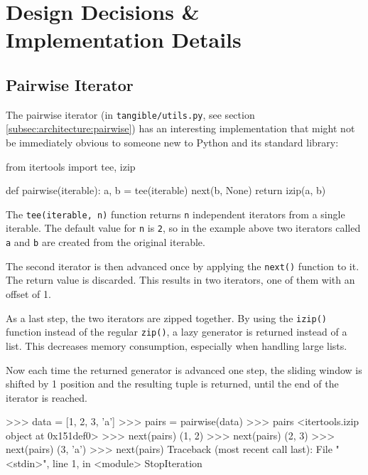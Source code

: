 
\chapter{Design Decisions \& Implementation Details}

\label{ch:design}


\section{Pairwise Iterator} \label{sec:design:pairwise}

The pairwise iterator (in \texttt{tangible/utils.py}, see section
\ref{subsec:architecture:pairwise}) has an interesting implementation that might
not be immediately obvious to someone new to Python and its standard library:

\vspace{.5\baselineskip}
\begin{pythoncode}
from itertools import tee, izip

def pairwise(iterable):
    a, b = tee(iterable)
    next(b, None)
    return izip(a, b)
\end{pythoncode}

\noindent The \texttt{tee(iterable, n)} function returns \texttt{n} independent
iterators from a single iterable. The default value for \texttt{n} is
\texttt{2}, so in the example above two iterators called \texttt{a} and
\texttt{b} are created from the original iterable.

The second iterator is then advanced once by applying the \texttt{next()}
function to it. The return value is discarded. This results in two iterators,
one of them with an offset of 1.

As a last step, the two iterators are zipped together. By using the
\texttt{izip()} function instead of the regular \texttt{zip()}, a lazy generator
is returned instead of a list. This decreases memory consumption, especially
when handling large lists.

Now each time the returned generator is advanced one step, the sliding window is
shifted by 1 position and the resulting tuple is returned, until the end of the
iterator is reached.

\vspace{.5\baselineskip}
\begin{pythoncode}
>>> data = [1, 2, 3, 'a']
>>> pairs = pairwise(data)
>>> pairs
<itertools.izip object at 0x151def0>
>>> next(pairs)
(1, 2)
>>> next(pairs)
(2, 3)
>>> next(pairs)
(3, 'a')
>>> next(pairs)
Traceback (most recent call last):
  File "<stdin>", line 1, in <module>
	StopIteration
\end{pythoncode}

